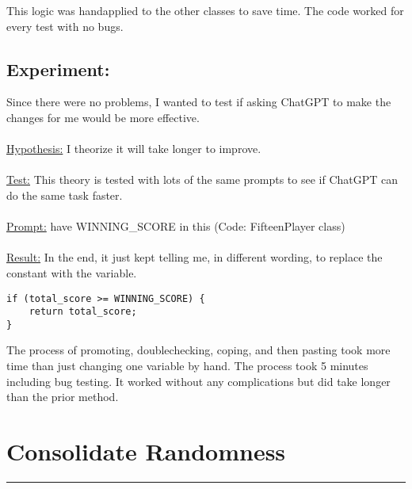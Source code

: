 \documentclass[a4paper,11pt]{article}
\begin{document}
This logic was hand\-applied to the other classes to save time. The code worked for every test with no bugs.
\subsection*{Experiment:}
Since there were no problems, I wanted to test if asking ChatGPT to make the changes for me would be more effective.\\\\
\underline{Hypothesis:} I theorize it will take longer to improve. \\\\
\underline{Test:} This theory is tested with lots of the same prompts to see if ChatGPT can do the same task faster.\\\\
\underline{Prompt:} have WINNING\_SCORE in this (Code: FifteenPlayer class)\\\\
\underline{Result:}
In the end, it just kept telling me, in different wording, to replace the constant with the variable.
\begin{lstlisting}
if (total_score >= WINNING_SCORE) {
    return total_score;
}
\end{lstlisting}
\noindent The process of promoting, double\-checking, coping, and then pasting took more time than just changing one variable by hand. The process took 5 minutes including bug testing. It worked without any complications but did take longer than the prior method.  

\section*{Consolidate Randomness}
\hrule
\vspace{13pt} %
\end{document}
